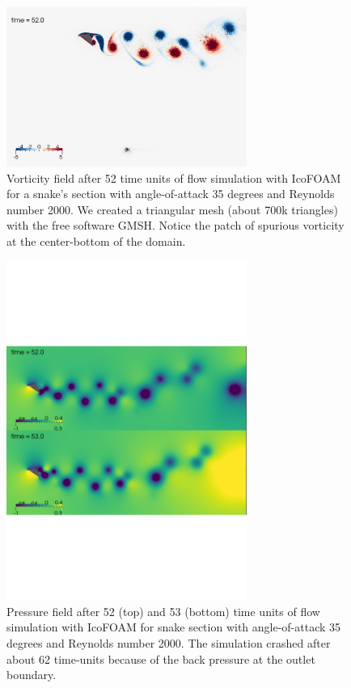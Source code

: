 \documentclass[9pt,twocolumn,twoside]{article}
\begin{document}
\begin{figure}
\centering
\includegraphics[width=0.7\textwidth]{./figures/openfoam/openfoam_vorticity52Re2000AoA35_gmshZeroGradient.pdf}
\caption{
Vorticity field after 52 time units of flow simulation with IcoFOAM for a snake's section with angle-of-attack 35 degrees and Reynolds number 2000.
We created a triangular mesh (about 700k triangles) with the free software GMSH. 
Notice the patch of spurious vorticity at the center-bottom of the domain.
}
\label{figure1}
\end{figure}


\begin{figure}
\centering
\includegraphics[width=0.7\textwidth]{./figures/openfoam/openfoam_pressureRe2000AoA35_gmshZeroGradient.pdf}
\caption{
Pressure field after 52 (top) and 53 (bottom) time units of flow simulation with IcoFOAM for snake section with angle-of-attack 35 degrees and Reynolds number 2000.
The simulation crashed after about 62 time-units because of the back pressure at the outlet boundary.
}
\label{figure2}
\end{figure}
\end{document}
